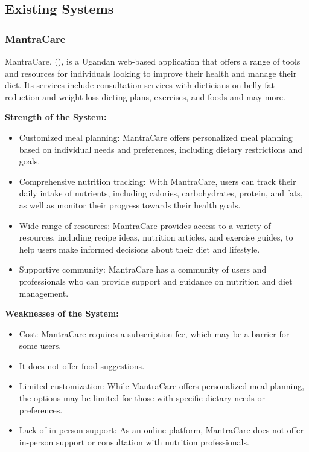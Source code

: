 \documentclass{article}
\begin{document}
\subsection{Existing Systems}

\subsubsection{MantraCare}

MantraCare, (\cite{mantracare}), is a Ugandan web-based application that offers a range of tools and resources for individuals looking to improve their health and manage their diet. Its services include consultation services with dieticians on belly fat reduction and weight loss dieting plans, exercises, and foods and may more.

\textbf{Strength of the System:}

\begin{itemize}

\item Customized meal planning: MantraCare offers personalized meal planning based on individual needs and preferences, including dietary restrictions and goals.
\item Comprehensive nutrition tracking: With MantraCare, users can track their daily intake of nutrients, including calories, carbohydrates, protein, and fats, as well as monitor their progress towards their health goals.
\item Wide range of resources: MantraCare provides access to a variety of resources, including recipe ideas, nutrition articles, and exercise guides, to help users make informed decisions about their diet and lifestyle.
\item Supportive community: MantraCare has a community of users and professionals who can provide support and guidance on nutrition and diet management.

\end{itemize}

\textbf{Weaknesses of the System:}

\begin{itemize}
\item Cost: MantraCare requires a subscription fee, which may be a barrier for some users.
\item It does not offer food suggestions.
\item Limited customization: While MantraCare offers personalized meal planning, the options may be limited for those with specific dietary needs or preferences.
\item Lack of in-person support: As an online platform, MantraCare does not offer in-person support or consultation with nutrition professionals.

\end{itemize}
\end{document}
